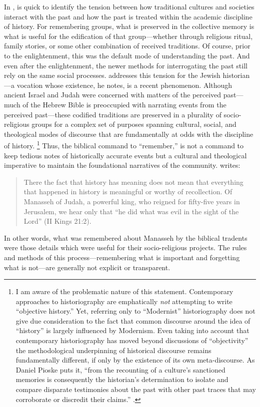 In , \yerushalmi is quick to identify the tension between how traditional cultures and societies interact with the past and how the past is treated within the academic discipline of history. For remembering groups, what is preserved in the collective memory is what is useful for the edification of that group---whether through religious ritual, family stories, or some other combination of received traditions. Of course, prior to the enlightenment, this was the default mode of understanding the past. And even after the enlightenment, the newer methods for interrogating the past still rely on the same social processes. \yerushalmi addresses this tension for the Jewish historian---a vocation whose existence, he notes, is a recent phenomenon.%
    \autocite[81--103]{yerushalmi1989}
Although ancient Israel and Judah were concerned with matters of the perceived past---much of the Hebrew Bible is preoccupied with narrating events from the perceived past---these codified traditions are preserved in a plurality of socio-religious groups for a complex set of purposes spanning cultural, social, and theological modes of discourse that are fundamentally at odds with the discipline of history.%
    \footnote{%
        I am aware of the problematic nature of this statement. Contemporary approaches to historiography are emphatically \emph{not} attempting to write ``objective history.'' Yet, referring only to ``Modernist'' historiography does not give due consideration to the fact that common discourse around the idea of ``history'' is largely influenced by Modernism. Even taking into account that contemporary historiography has moved beyond discussions of ``objectivity'' the methodological underpinning of historical discourse remains fundamentally different, if only by the existence of its own meta-discourse. As Daniel Pioske puts it, ``from the recounting of a culture's sanctioned memories is consequently the historian's determination to isolate and compare disparate testimonies about the past with other past traces that may corroborate or discredit their claims.''
        \cite[12--13]{pioske_bibint2015}.}
Thus, the biblical command to ``remember,'' is not a command to keep tedious notes of historically accurate events but a cultural and theological imperative to maintain the foundational narratives of the community. \yerushalmi writes:  

\begin{quote}
    There the fact that history has meaning does not mean that everything that happened in history is meaningful or worthy of recollection. Of Manasseh of Judah, a powerful king, who reigned for fifty-five years in Jerusalem, we hear only that ``he did what was evil in the sight of the Lord'' (II Kings 21:2).%
        \autocite[10]{yerushalmi1989}
\end{quote}  
\noindent
In other words, what was remembered about Manasseh by the biblical tradents were those details which were useful for their socio-religious projects. The rules and methods of this process---remembering what is important and forgetting what is not---are generally not explicit or transparent.  

